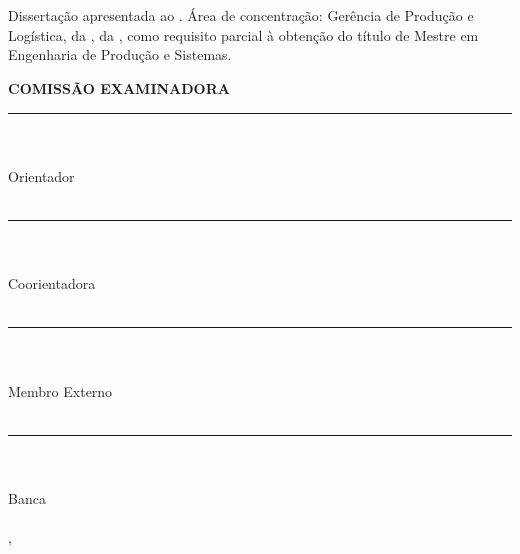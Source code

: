 \begin{center}
    {\MakeUppercase{\textbf{\aluno}} \\ [1cm]

    \MakeUppercase{\textbf{\titulo}} \\ [1cm]

    \hspace{.45\textwidth} %
        \begin{minipage}{.5\textwidth}
        \noindent Dissertação apresentada ao \curso. Área de concentração: Gerência de Produção e Logística, da \departamento, da \universidade, como requisito parcial à obtenção do título de Mestre em Engenharia de Produção e Sistemas. \\ [5mm]
        \end{minipage}
    \textbf{COMISSÃO EXAMINADORA} \\ [1cm]
    
    \rule{5cm}{.1mm} \\ \orientador \\ Orientador\\ \universidade \\ [5mm]

    \rule{5cm}{.1mm} \\ \coorientador \\ Coorientadora \\ \universidade \\ [5mm]

    \rule{5cm}{.1mm} \\ \convidadoa \\ Membro Externo \\ \univconvidadoa \\ [5mm]
    
    \rule{5cm}{.1mm} \\ \convidadob \\ Banca \\ \univconvidadob \\ [5mm]
    
  
    
    \cidade, \datadefesa
    }
\end{center}
